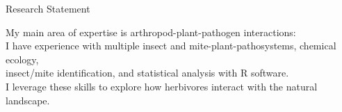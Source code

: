 \documentclass{resume} %
\begin{document}
\begin{rSection}{Research Statement}

My main area of expertise is arthropod-plant-pathogen interactions:\\
I have experience with multiple insect and mite-plant-pathosystems, chemical ecology,\\
insect/mite identification, and statistical analysis with R software.\\
I leverage these skills to explore how herbivores interact with the natural landscape.

\end{rSection}
\end{document}
